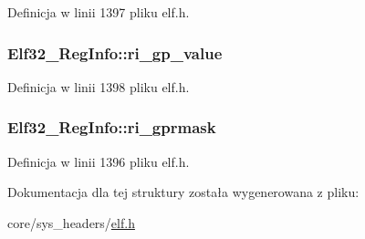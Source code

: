Definicja w linii 1397 pliku elf.\-h.

\hypertarget{struct_elf32___reg_info_ae464ec715b979270bedadc8889f94a16}{
\subsubsection[{ri\-\_\-gp\-\_\-value}]{ Elf32\-\_\-\-Reg\-Info\-::ri\-\_\-gp\-\_\-value}}\label{struct_elf32___reg_info_ae464ec715b979270bedadc8889f94a16}


Definicja w linii 1398 pliku elf.\-h.

\hypertarget{struct_elf32___reg_info_a14e7256134e34950e4fb5681d77dd353}{
\subsubsection[{ri\-\_\-gprmask}]{ Elf32\-\_\-\-Reg\-Info\-::ri\-\_\-gprmask}}\label{struct_elf32___reg_info_a14e7256134e34950e4fb5681d77dd353}


Definicja w linii 1396 pliku elf.\-h.



Dokumentacja dla tej struktury została wygenerowana z pliku\-:\begin{DoxyCompactItemize}
\item 
core/sys\-\_\-headers/\hyperlink{elf_8h}{elf.\-h}\end{DoxyCompactItemize}
